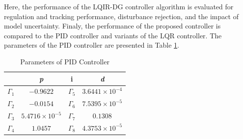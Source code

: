 \documentclass[3p,times]{elsarticle}
\begin{document}

\noindent Here, the performance of the LQIR-DG controller algorithm is evaluated for regulation and tracking performance, disturbance rejection, and the impact of model uncertainty.
Finaly, the performance of the proposed controller is compared to the PID controller and variants of the LQR controller. The parameters of the PID controller are presented in Table \ref{tab:PID_parameters}.

\begin{table}[H]
	\renewcommand{\arraystretch}{1.3}
	\caption{Parameters of PID Controller}
	\begin{center}
	\begin{tabular}{c |c c c}
	\cmidrule{2-4}
	 & \textbf{\textit{p}}& \textbf{i} & \textbf{\textit{d}}  \\
	\hline
	$\Gamma_1$ & $-0.9622$ & $\Gamma_5$ & $3.6441\times10^{-4}$ \\

	$\Gamma_2$ & $-0.0154$ & $\Gamma_6$ & $7.5395\times10^{-5}$ \\

	$\Gamma_3$ &$5.4716\times10^{-5}$ & $\Gamma_7$ & $0.1308$ \\

	$\Gamma_4$ & $1.0457$ & $\Gamma_8$ & $4.3753\times10^{-5}$ \\
	\hline
	\end{tabular}
	\label{tab:PID_parameters}
	\end{center}
\end{table}
\end{document}
